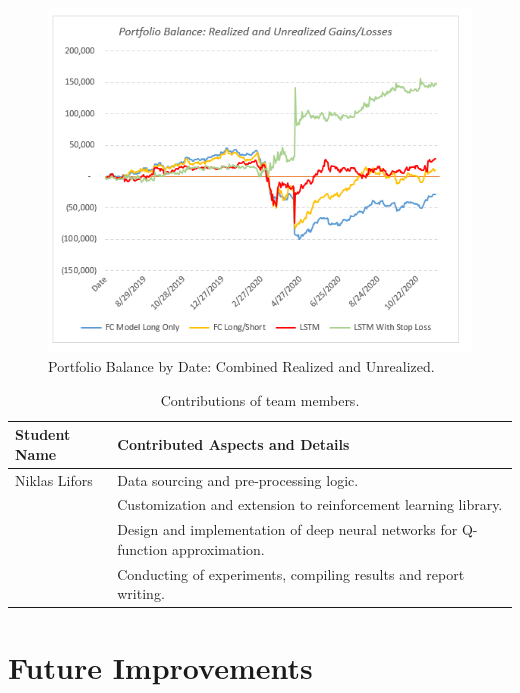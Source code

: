 \documentclass[10pt,twocolumn,letterpaper]{article}
\begin{document}
\begin{figure}[hbt!]
\begin{center}
     \includegraphics[scale=0.57]{portfolio_balance.PNG}
     \caption{Portfolio Balance by Date: Combined Realized and Unrealized.}
\end{center}
\end{figure}

\begin{table}
\begin{center}
\begin{tabular}{|l|l|}
\hline
Student Name & Contributed Aspects and Details\\
\hline\hline
Niklas Lifors & Data sourcing and pre-processing logic.\\
& Customization and extension to reinforcement learning library.\\
& Design and implementation of deep neural networks for Q-function approximation.\\
& Conducting of experiments, compiling results and report writing.\\
\hline
\end{tabular}
\end{center}
\caption{Contributions of team members.}
\label{tab:contributions}
\end{table}

\section{Future Improvements}
\end{document}
